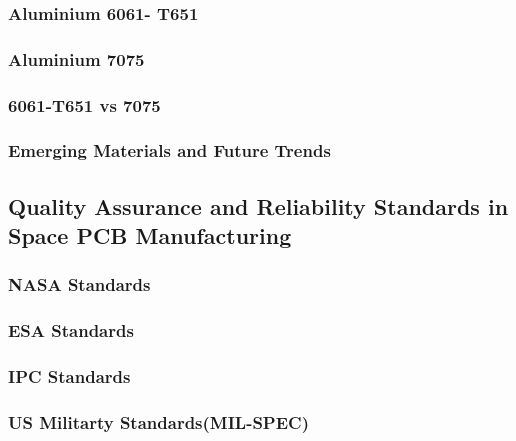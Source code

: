 \subsubsection{Aluminium 6061- T651}

\subsubsection{Aluminium 7075}

\subsubsection{6061-T651 vs  7075}

\subsubsection{Emerging Materials and Future Trends} 

\subsection{Quality Assurance and Reliability Standards in Space PCB Manufacturing}

\subsubsection{NASA Standards}

\subsubsection{ESA Standards}

\subsubsection{IPC Standards}

\subsubsection{US Militarty Standards(MIL-SPEC)}


